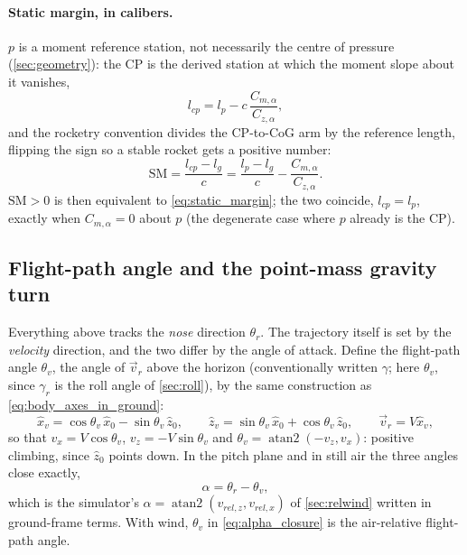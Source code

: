 \paragraph{Static margin, in calibers.} $p$ is a moment reference station, not necessarily the centre
of pressure (\autoref{sec:geometry}): the CP is the derived station at which the moment slope about it
vanishes,
\begin{equation}
    l_{cp} = l_p - c\,\frac{C_{m,\alpha}}{C_{z,\alpha}},
\end{equation}
and the rocketry convention divides the CP-to-CoG arm by the reference length, flipping the sign so a
stable rocket gets a positive number:
\begin{equation}
    \mathrm{SM} = \frac{l_{cp}-l_g}{c} = \frac{l_p-l_g}{c} - \frac{C_{m,\alpha}}{C_{z,\alpha}}.
\end{equation}
$\mathrm{SM}>0$ is then equivalent to \autoref{eq:static_margin}; the two coincide, $l_{cp}=l_p$, exactly
when $C_{m,\alpha}=0$ about $p$ (the degenerate case where $p$ already is the CP).

\subsection{Flight-path angle and the point-mass gravity turn}\label{sec:analysis_flightpath}
Everything above tracks the \emph{nose} direction $\theta_r$. The trajectory itself is set by the
\emph{velocity} direction, and the two differ by the angle of attack. Define the flight-path angle
$\theta_v$, the angle of $\vec{v}_r$ above the horizon (conventionally written $\gamma$; here
$\theta_v$, since $\gamma_r$ is the roll angle of \autoref{sec:roll}), by the same construction as
\autoref{eq:body_axes_in_ground}:
\begin{equation}\label{eq:vel_axes_in_ground}
    \hat{x}_v = \cos\theta_v\,\hat{x}_0 - \sin\theta_v\,\hat{z}_0, \qquad
    \hat{z}_v = \sin\theta_v\,\hat{x}_0 + \cos\theta_v\,\hat{z}_0, \qquad
    \vec{v}_r = V\hat{x}_v,
\end{equation}
so that $v_x=V\cos\theta_v$, $v_z=-V\sin\theta_v$ and $\theta_v=\operatorname{atan2}(-v_z,v_x)$:
positive climbing, since $\hat{z}_0$ points down. In the pitch plane and in still air the three
angles close exactly,
\begin{equation}\label{eq:alpha_closure}
    \alpha = \theta_r - \theta_v,
\end{equation}
which is the simulator's $\alpha=\operatorname{atan2}(v_{rel,z},v_{rel,x})$ of
\autoref{sec:relwind} written in ground-frame terms. With wind, $\theta_v$ in
\autoref{eq:alpha_closure} is the air-relative flight-path angle.

